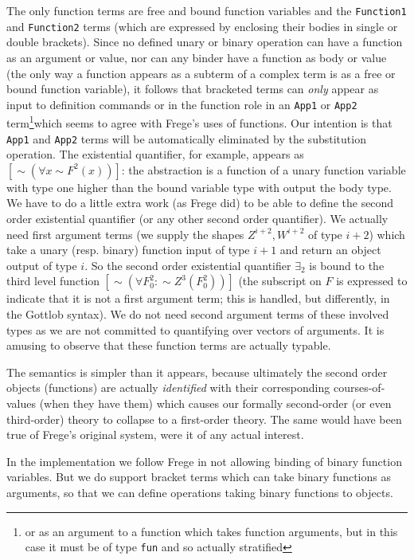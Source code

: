 \documentclass{article}
\begin{document}
{{The only function terms are free and bound function variables and the {\tt Function1} and {\tt Function2} terms (which are expressed by enclosing their bodies in single or double brackets).  Since no defined unary or binary operation can have a function as an argument or value, nor can any binder have a function as body or value  (the only way a function appears as a subterm of a complex term is as a free or bound function variable), it follows that
bracketed terms can {\em only\/} appear as input to definition commands or in the function role in an {\tt App1} or {\tt App2} term\footnote{or as an argument to a function which takes function arguments, but in this case it must be of type {\tt fun} and so actually stratified}which seems to agree with Frege's uses of functions.  Our intention is that {\tt App1} and {\tt App2} terms will be automatically eliminated by the substitution operation.  The existential quantifier, for example, appears as $[\sim(\forall x \sim F^2(x))]$:  the abstraction is a function of a unary function variable with type one higher than the bound variable type with output the body type.  We have to do a little extra work (as Frege did) to be able to define the second order existential quantifier (or any other second order quantifier).  We actually need first argument terms (we supply the shapes $Z^{i+2},W^{i+2}$ of type $i+2$) which take a unary (resp. binary) function  input of type $i+1$ and return an object output of type $i$.  So the second order existential quantifier $\exists_2$ is bound to the third level function $[\sim(\forall F^2_0: \sim Z^{3}(F^2_0))]$ (the subscript on $F$ is expressed to indicate that it is not a first argument term; this is handled, but differently, in the Gottlob syntax).  We do not need second argument terms of these involved types as we are not committed to quantifying over vectors of arguments.  It is amusing to observe that these function terms are actually typable.

The semantics is simpler than it appears, because ultimately the second order objects (functions) are actually {\em identified\/} with their corresponding courses-of-values (when they have them) which causes our formally  second-order (or even third-order) theory to collapse to a first-order theory.  The same would have been true of Frege's original system, were it of any actual interest.

In the implementation we follow Frege in not allowing binding of binary function variables.  But we do support bracket terms which can take binary functions as arguments, so that we can define operations taking binary functions to objects.

}}
\end{document}
